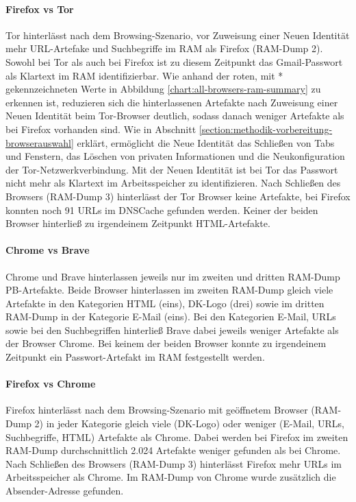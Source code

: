 \paragraph*{Firefox vs Tor}
Tor hinterlässt nach dem Browsing-Szenario, vor Zuweisung einer \glqq{}Neuen Identität\grqq{} mehr URL-Artefake und Suchbegriffe im RAM als Firefox (RAM-Dump 2). 
Sowohl bei Tor als auch bei Firefox ist zu diesem Zeitpunkt das Gmail-Passwort als Klartext im RAM identifizierbar.
Wie anhand der roten, mit * gekennzeichneten Werte in Abbildung \ref{chart:all-browsers-ram-summary} zu erkennen ist, 
reduzieren sich die hinterlassenen Artefakte nach Zuweisung einer \glqq{}Neuen Identität\grqq{} beim Tor-Browser deutlich, sodass danach weniger Artefakte als bei Firefox vorhanden sind.
Wie in Abschnitt \ref{section:methodik-vorbereitung-browserauswahl} erklärt, ermöglicht die \glqq{}Neue Identität\grqq{} das Schließen von Tabs und Fenstern, das Löschen von privaten Informationen und die Neukonfiguration der Tor-Netzwerkverbindung.
Mit der \glqq{}Neuen Identität\grqq{} ist bei Tor das Passwort nicht mehr als Klartext im Arbeitsspeicher zu identifizieren.
Nach Schließen des Browsers (RAM-Dump 3) hinterlässt der Tor Browser keine Artefakte, bei Firefox konnten noch 91 URLs im DNSCache gefunden werden. 
Keiner der beiden Browser hinterließ zu irgendeinem Zeitpunkt HTML-Artefakte.

\paragraph*{Chrome vs Brave}
Chrome und Brave hinterlassen jeweils nur im zweiten und dritten RAM-Dump PB-Artefakte. Beide Browser hinterlassen im zweiten RAM-Dump gleich viele Artefakte in den Kategorien HTML (eins), DK-Logo (drei) sowie im dritten RAM-Dump in der Kategorie E-Mail (eins). Bei den Kategorien E-Mail, URLs sowie bei den Suchbegriffen hinterließ Brave dabei jeweils weniger Artefakte als der Browser Chrome. Bei keinem der beiden Browser konnte zu irgendeinem Zeitpunkt ein Passwort-Artefakt im RAM festgestellt werden.

\paragraph*{Firefox vs Chrome}
Firefox hinterlässt nach dem Browsing-Szenario mit geöffnetem Browser (RAM-Dump 2) in jeder Kategorie gleich viele (DK-Logo) oder weniger (E-Mail, URLs, Suchbegriffe, HTML) Artefakte als Chrome.
Dabei werden bei Firefox im zweiten RAM-Dump durchschnittlich 2.024 Artefakte weniger gefunden als bei Chrome.
Nach Schließen des Browsers (RAM-Dump 3) hinterlässt Firefox mehr URLs im Arbeitsspeicher als Chrome. Im RAM-Dump von Chrome wurde zusätzlich die Absender-Adresse gefunden.

